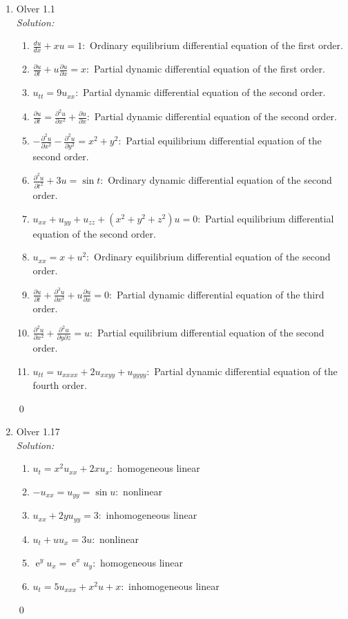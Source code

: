 \documentclass[10pt]{amsart}
\DeclareMathOperator{\E}{e}
\theoremstyle{nonumberplain}
\begin{document}
\begin{enumerate}[label={\bf {\arabic*}:}]
\item Olver 1.1 \\
\textit{Solution:}
\begin{enumerate}
\item $\frac {du}{dx} + xu = 1:$ \quad Ordinary equilibrium differential equation of the first order.
\item $\frac {\partial u}{\partial t} + u \frac{\partial u }{\partial x} = x:$ \quad Partial dynamic differential equation of the first order.
\item $u_{tt} = 9u_{xx}:$ \quad Partial dynamic differential equation of the second order.
\item $\frac {\partial u}{\partial t} = \frac{\partial^2 u }{\partial x^2} + \frac{\partial u }{\partial x}:$ \quad Partial dynamic differential equation of the second order.
\item $- \frac{\partial^2 u }{\partial x^2} - \frac{\partial^2 u }{\partial y^2} = x^2 + y^2:$ \quad Partial equilibrium differential equation of the second order.
\item $\frac{\partial^2 u }{\partial t^2} + 3u = \sin t:$ \quad Ordinary dynamic differential equation of the second order.
\item $u_{xx} + u_{yy} + u_{zz} + (x^2 + y^2 + z^2)u = 0:$ \quad Partial equilibrium differential equation of the second order.
\item $u_{xx} = x + u^2:$ \quad Ordinary equilibrium differential equation of the second order.
\item $\frac{\partial u }{\partial t} + \frac{\partial^3 u }{\partial x^3} + u \frac{\partial u }{\partial x} = 0:$ \quad Partial dynamic differential equation of the third order.
\item $\frac{\partial^2 u }{\partial x^2} + \frac{\partial^2 u }{\partial y \partial z} = u:$ \quad Partial equilibrium differential equation of the second order.
\item $u_{tt} = u_{xxxx} + 2u_{xxyy} + u_{yyyy}:$ \quad Partial dynamic differential equation of the fourth order.
\end{enumerate}
\qed \\

\item Olver 1.17 \\
\textit{Solution:}
\begin{enumerate}
\item $u_t = x^2u_{xx} + 2xu_x:$ \quad homogeneous linear
\item $-u_{xx} = u_{yy} = \sin u:$ \quad nonlinear
\item $u_{xx} + 2yu_{yy} = 3:$ \quad inhomogeneous linear
\item $u_t + uu_x = 3u:$ \quad nonlinear
\item $\E^yu_x = \E^xu_y:$ \quad homogeneous linear
\item $u_t = 5u_{xxx} + x^2u + x:$ \quad inhomogeneous linear
\end{enumerate}
\qed \\
\newpage


\end{enumerate}
\end{document}
